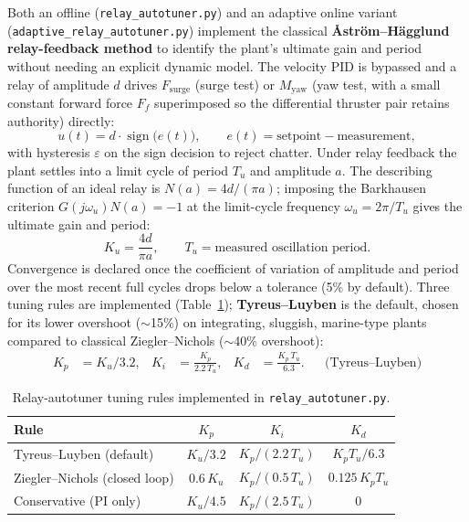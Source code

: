 Both an offline (\texttt{relay\_autotuner.py}) and an adaptive online variant (\texttt{adaptive\_relay\_autotuner.py}) implement the classical \textbf{Åström--Hägglund relay-feedback method} to identify the plant's ultimate gain and period without needing an explicit dynamic model. The velocity PID is bypassed and a relay of amplitude $d$ drives $F_{\text{surge}}$ (surge test) or $M_{\text{yaw}}$ (yaw test, with a small constant forward force $F_f$ superimposed so the differential thruster pair retains authority) directly:
\begin{equation}
u(t) = d\cdot\operatorname{sign}\big(e(t)\big), \qquad e(t) = \text{setpoint} - \text{measurement},
\end{equation}
with hysteresis $\varepsilon$ on the sign decision to reject chatter. Under relay feedback the plant settles into a limit cycle of period $T_u$ and amplitude $a$. The describing function of an ideal relay is $N(a) = 4d/(\pi a)$; imposing the Barkhausen criterion $G(j\omega_u)N(a)=-1$ at the limit-cycle frequency $\omega_u = 2\pi/T_u$ gives the ultimate gain and period:
\begin{equation}
K_u = \frac{4d}{\pi a}, \qquad T_u = \text{measured oscillation period}.
\end{equation}
Convergence is declared once the coefficient of variation of amplitude and period over the most recent full cycles drops below a tolerance (5\% by default). Three tuning rules are implemented (Table~\ref{tab:tuningrules}); \textbf{Tyreus--Luyben} is the default, chosen for its lower overshoot ($\sim$15\%) on integrating, sluggish, marine-type plants compared to classical Ziegler--Nichols ($\sim$40\% overshoot):
\begin{align}
K_p &= K_u/3.2, & K_i &= \frac{K_p}{2.2\,T_u}, & K_d &= \frac{K_p\,T_u}{6.3}. &&\text{(Tyreus--Luyben)}
\end{align}

\begin{table}[H]
\centering
\caption{Relay-autotuner tuning rules implemented in \texttt{relay\_autotuner.py}.}
\label{tab:tuningrules}
\begin{tabular}{@{}lccc@{}}
\toprule
Rule & $K_p$ & $K_i$ & $K_d$ \\
\midrule
Tyreus--Luyben (default) & $K_u/3.2$ & $K_p/(2.2\,T_u)$ & $K_p T_u/6.3$ \\
Ziegler--Nichols (closed loop) & $0.6\,K_u$ & $K_p/(0.5\,T_u)$ & $0.125\,K_p T_u$ \\
Conservative (PI only) & $K_u/4.5$ & $K_p/(2.5\,T_u)$ & $0$ \\
\bottomrule
\end{tabular}
\end{table}

